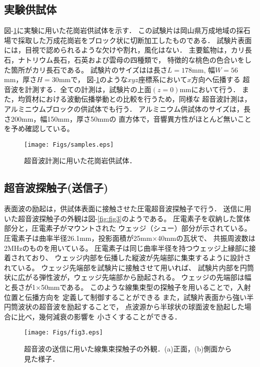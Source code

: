 ﻿%
\subsection{実験供試体}
図-\ref{fig:fig1}に実験に用いた花崗岩供試体を示す．
この試験片は岡山県万成地域の採石場で採取した万成花崗岩をブロック状に切断加工したものである．
試験片表面には，目視で認められるような欠けや割れ，風化はない．
主要鉱物は，カリ長石，ナトリウム長石，石英および雲母の四種類で，
特徴的な桃色の色合いをした箇所がカリ長石である。
試験片のサイズはは長さ$L=178$mm, 幅$W=56$mm，厚さ$H=30$mmで，
図-\ref{fig:fig1}のような$xyz$座標系において$x$方向へ伝播する
超音波を計測する．全ての計測は，試験片の上面$(z=0)$mmにおいて行う．
また，均質材における波動伝播挙動との比較を行うため，同様な
超音波計測は，アルミニウムブロックの供試体でも行う．
アルミニウム供試体のサイズは，長さ200mm，幅150mm，厚さ50mmの
直方体で，音響異方性がほとんど無いことを予め確認している。
\begin{figure}
\begin{center}
\texttt{[image: Figs/samples.eps]}
\caption{
	超音波計測に用いた花崗岩供試体．
}
\label{fig:fig1}
\end{center}
\end{figure}
\subsection{超音波探触子(送信子)}
表面波の励起は，供試体表面に接触させた圧電超音波探触子で行う．
送信に用いた超音波探触子の外観は図-\ref{fig:fig3}のようである。
圧電素子を収納した筐体部分と，圧電素子がマウントされた
ウェッジ（シュー）部分が示されている。
圧電素子は曲率半径26.1mm，投影面積が25mm×40mmの瓦状で、
共振周波数は2MHzのものを用いている。
圧電素子は同じ曲率半径を持つウェッジ上縁部に接着されており、
ウェッジ内部を伝播した縦波が先端部に集束するように設計されている。
ウェッジ先端部を試験片に接触させて用いれば、
試験片内部を円筒状に広がる弾性波が，ウェッジ先端部から励起される。
ウェッジの先端部は幅と長さが1×50mmである。
このような線集束型の探触子を用いることで，入射位置と伝播方向を
定義して制御することができる
また，試験片表面から強い半円筒波状の超音波を励起することで，
点波源から半球状の球面波を励起した場合に比べ，幾何減衰の影響を
小さくすることができる．
\begin{figure}[h]
\begin{center}
\texttt{[image: Figs/fig3.eps]}
\caption{
	超音波の送信に用いた線集束探触子の外観．(a)正面，(b)側面から見た様子．
}
\label{fig:fig2}
\end{center}
\end{figure}
